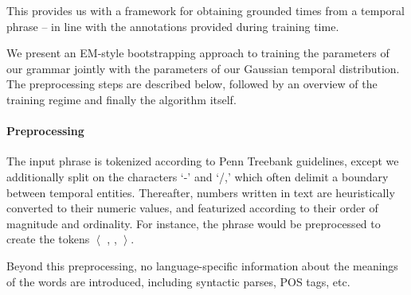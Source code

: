 This provides us with a framework for obtaining grounded times from a
	temporal phrase -- in line with the annotations provided during training
	time.


We present an EM-style bootstrapping approach to training the 
	parameters of our grammar jointly with the parameters of our 
	Gaussian temporal distribution.
The preprocessing steps are described below, followed by an overview
	of the training regime and finally the algorithm itself.

\paragraph{Preprocessing}
The input phrase is tokenized according to Penn Treebank guidelines,
	except we additionally split on the characters `-' and `/,' which
	often delimit a boundary between temporal entities.
Thereafter, numbers written in text are heuristically converted to their
	numeric values, and featurized according to their order of magnitude
	and ordinality.
For instance, the phrase  would be preprocessed to create the
	tokens $\left<\right.$  , \tp{-} ,  
		$\left.\right>$.

Beyond this preprocessing, no language-specific information about the meanings
	of the words are introduced, including syntactic parses, POS tags, etc.


